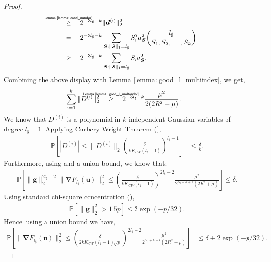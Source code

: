 \documentclass[final,12pt]{colt2018} %
\newcommand{\Prob}{\mathbb{P}}
\newcommand{\explain}[2]{\mathrel{\overset{\makebox[0pt]{\mbox{\normalfont\tiny\sffamily #1}}}{#2}}}
\renewcommand\v[1]{{\ensuremath{\boldsymbol{#1}}}}
\begin{document}
\begin{proof}
\begin{align*}
    & \quad \explain{Lemma~\ref{lemma: cond_number}}{\geq} \quad 2^{-3l_\sharp - k} \| \v d^{(i)}\|_2^2 \\
    & \quad = \quad 2^{-3l_\sharp - k} \sum_{{\v S}: \|{\v S}\|_1 = l_\sharp} S_i^2 a_{\v S}^2 \binom{l_\sharp}{S_1, S_2, \dotsc, S_k} \\
    & \quad \geq \quad 2^{-3l_\sharp - k} \sum_{{\v S}: \|{\v S}\|_1 = l_\sharp} S_i a_{\v S}^2. \\
\end{align*}
Combining the above display with Lemma \ref{lemma: good_l_multiindex}, we get,
\begin{align*}
    \sum_{i=1}^k \| D^{(i)}\|_2^2 & \quad \explain{Lemma~\ref{lemma: good_l_multiindex}}{\geq} \quad 2^{-3l_\sharp - k} \frac{\mu^2}{2(2R^2 + \mu)}. 
\end{align*}
We know that $D^{(i)}$ is a polynomial in $k$ independent Gaussian variables of degree $l_\sharp - 1$. Applying Carbery-Wright Theorem (), 
\begin{align*}
\Prob \left[ |D^{(i)}| \leq \| D^{(i)}\|_2 \left( \frac{\delta}{kK_{CW}(l_\sharp-1)} \right)^{l_\sharp-1}  \right] & \leq \frac{\delta}{k}.
\end{align*}
Furthermore, using  and a union bound, we know that:
\begin{align*}
    \Prob \left[ \| \v g \|_2^{2l_\sharp - 2} \| \v \nabla F_{l_\sharp}(\v u) \|_2^2 \leq \left( \frac{\delta}{kK_{CW}(l_\sharp-1)} \right)^{2l_\sharp-2} \frac{\mu^2}{2^{3l_\sharp+k+1}(2R^2+\mu)} \right]  \leq \delta.
\end{align*}
Using standard chi-square concentration (),
\begin{align*}
    \Prob[\|\v g\|_2^2 > 1.5 p] \leq 2\exp(-p/32).
\end{align*}
Hence, using a union bound we have,
\begin{align*}
    \Prob \left[ \| \v \nabla F_{l_\sharp}(\v u) \|_2^2 \leq  \left( \frac{\delta}{2kK_{CW}(l_\sharp-1)\sqrt{p}} \right)^{2l_\sharp-2} \frac{\mu^2}{2^{3l_\sharp+k+1}(2R^2+\mu)} \right] & \leq \delta + 2\exp(-p/32).
\end{align*}
\end{proof}
\end{document}
